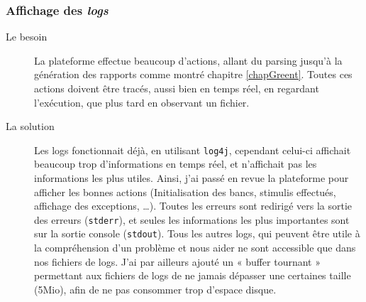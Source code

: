 	\subsubsection{Affichage des \textit{logs}}
		\begin{description}
			\item[Le besoin] La plateforme effectue beaucoup d'actions, allant du parsing jusqu'à la génération des rapports comme montré chapitre \ref{chapGreent}. Toutes ces actions doivent être tracés, aussi bien en temps réel, en regardant l'exécution, que plus tard en observant un fichier.
			\item[La solution] Les logs fonctionnait déjà, en utilisant \texttt{log4j}, cependant celui-ci affichait beaucoup trop d'informations en temps réel, et n'affichait pas les informations les plus utiles. Ainsi, j'ai passé en revue la plateforme pour afficher les bonnes actions (Initialisation des bancs, stimulis effectués, affichage des exceptions, \ldots). Toutes les erreurs sont redirigé vers la sortie des erreurs (\texttt{stderr}), et seules les informations les plus importantes sont sur la sortie console (\texttt{stdout}). Tous les autres logs, qui peuvent être utile à la compréhension d'un problème et nous aider ne sont accessible que dans nos fichiers de logs. J'ai par ailleurs ajouté un « buffer tournant » permettant aux fichiers de logs de ne jamais dépasser une certaines taille (5Mio), afin de ne pas consommer trop d'espace disque.
		\end{description}
		


